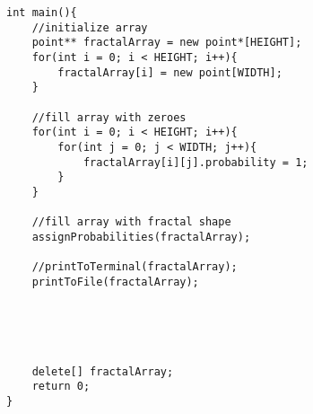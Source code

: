 \begin{lstlisting}
int main(){
	//initialize array
	point** fractalArray = new point*[HEIGHT];
	for(int i = 0; i < HEIGHT; i++){
		fractalArray[i] = new point[WIDTH];
	}

	//fill array with zeroes
	for(int i = 0; i < HEIGHT; i++){
		for(int j = 0; j < WIDTH; j++){
			fractalArray[i][j].probability = 1;
		}
	}

	//fill array with fractal shape
	assignProbabilities(fractalArray);

	//printToTerminal(fractalArray);
	printToFile(fractalArray);





	delete[] fractalArray;
	return 0;
}

\end{lstlisting}